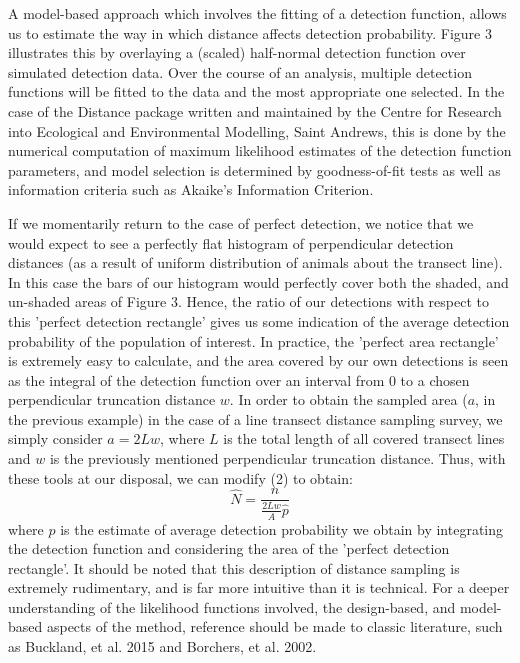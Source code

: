 \documentclass[11pt]{article}
\begin{document}
\begin{multicols}{2}
A model-based approach which involves the fitting of a detection function, allows us to estimate the way in which distance affects detection probability. Figure 3 illustrates this by overlaying a (scaled) half-normal detection function over simulated detection data. Over the course of an analysis, multiple detection functions will be fitted to the data and the most appropriate one selected. In the case of the Distance package written and maintained by the Centre for Research into Ecological and Environmental Modelling, Saint Andrews, this is done by the numerical computation of maximum likelihood estimates of the detection function parameters, and model selection is determined by goodness-of-fit tests as well as information criteria such as Akaike's Information Criterion.


If we momentarily return to the case of perfect detection, we notice that we would expect to see a perfectly flat histogram of perpendicular detection distances (as a result of uniform distribution of animals about the transect line). In this case the bars of our histogram would perfectly cover both the shaded, and un-shaded areas of Figure 3. Hence, the ratio of our detections with respect to this 'perfect detection rectangle' gives us some indication of the average detection probability of the population of interest. In practice, the 'perfect area rectangle' is extremely easy to calculate, and the area covered by our own detections is seen as the integral of the detection function over an interval from $0$ to a chosen perpendicular truncation distance $w$. In order to obtain the sampled area ($a$, in the previous example) in the case of a line transect distance sampling survey, we simply consider $a=2Lw$, where $L$ is the total length of all covered transect lines and $w$ is the previously mentioned perpendicular truncation distance. Thus, with these tools at our disposal, we can modify (2) to obtain:
\begin{equation}
\hat{N}=\frac{n}{\frac{2Lw}{A}\hat{p}}
\end{equation}
where $\hat{p}$ is the estimate of average detection probability we obtain by integrating the detection function and considering the area of the 'perfect detection rectangle'. It should be noted that this description of distance sampling is extremely rudimentary, and is far more intuitive than it is technical. For a deeper understanding of the likelihood functions involved, the design-based, and model-based aspects of the method, reference should be made to classic literature, such as Buckland, et al. 2015 and Borchers, et al. 2002. 


\end{multicols}
\end{document}
